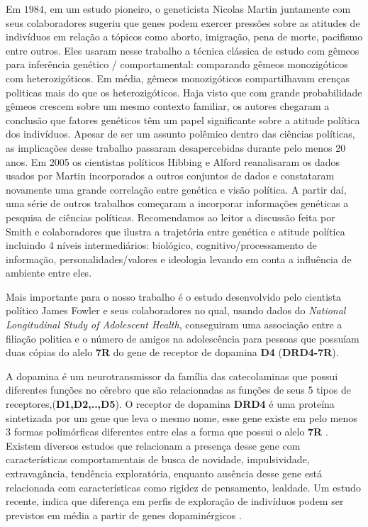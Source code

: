 Em $1984$, em um estudo\cite{Martin1986} pioneiro, o geneticista Nicolas
Martin juntamente com seus colaboradores sugeriu que genes podem exercer
pressões sobre as atitudes de indivíduos em relação a tópicos como
aborto, imigração, pena de morte, pacifismo entre outros. Eles usaram nesse
trabalho a técnica clássica de estudo com gêmeos para inferência genético
/ comportamental: comparando gêmeos monozigóticos com heterozigóticos.
Em média, gêmeos monozigóticos compartilhavam crenças politicas mais
do que os heterozigóticos. Haja visto que com grande probabilidade gêmeos
crescem sobre um mesmo contexto familiar, os autores chegaram a conclusão
que fatores genéticos têm um papel significante sobre a atitude política
dos indivíduos\cite{Buchen2012}. Apesar de ser um assunto polêmico
dentro das ciências políticas, as implicações desse trabalho passaram
desapercebidas durante pelo menos 20 anos. Em 2005  os cientistas políticos
Hibbing e Alford reanalisaram os dados usados por Martin incorporados a
outros conjuntos de dados e constataram novamente uma grande correlação
entre genética e visão política\cite{Alford2005}.  A partir daí, uma
série de outros trabalhos começaram a incorporar informações genéticas
a pesquisa de ciências políticas.  Recomendamos ao leitor a discussão
feita por Smith e colaboradores \cite{Smith2011} que ilustra a trajetória
entre genética e atitude política incluindo 4 níveis intermediários:
biológico, cognitivo/processamento de informação, personalidades/valores
e ideologia levando em conta a influência de ambiente entre eles.

Mais importante para o nosso trabalho é o estudo desenvolvido pelo
cientista político James Fowler e seus colaboradores no qual, usando dados
do \textit{National Longitudinal Study of Adolescent Health}, conseguiram
uma associação entre a filiação politica e o número de amigos na
adolescência para pessoas que possuíam duas cópias do alelo \textbf{7R} do
gene de receptor de dopamina \textbf{D4} (\textbf{DRD4-7R}).

A dopamina é um neurotransmissor da família das catecolaminas que possui
diferentes funções no cérebro que são relacionadas as funções de
seus 5 tipos de receptores,(\textbf{D1,D2,..,D5}). O receptor de dopamina
\textbf{DRD4} é uma proteína sintetizada por um gene que leva o mesmo nome,
esse gene existe em pelo menos 3 formas polimórficas diferentes entre elas
a forma que possui o alelo \textbf{7R} \citep{Dawes2009, Tol1992}. Existem
diversos estudos que relacionam a presença desse gene com características
comportamentais de busca de novidade, impulsividade, extravagância,
tendência exploratória, enquanto ausência desse gene está relacionada com
características como rigidez de pensamento, lealdade. Um estudo recente,
indica que diferença em perfis de exploração de indivíduos  podem ser
previstos em média a partir de genes dopaminérgicos \citep{Frank2009}.

